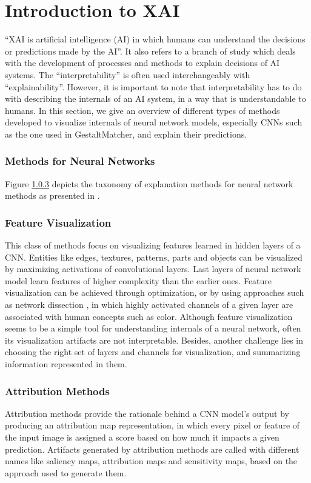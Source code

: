 \documentclass[../report.tex]{subfiles}
\begin{document}
    \section{Introduction to XAI}
	\enquote{XAI is artificial intelligence (AI) in which humans can understand the decisions or predictions made by the AI}\cite{vilone2021notions}. It also refers to a branch of study which deals with the development of processes and methods to explain decisions of AI systems. The \enquote{interpretability} is often used interchangeably with \enquote{explainability}. However, it is important to note that interpretability has to do with describing the internals of an AI system, in a way that is understandable to humans. In this section, we give an overview of different types of methods developed to visualize internals of neural network models, especially CNNs such as the one used in GestaltMatcher, and explain their predictions.
	
	\subsubsection{Methods for Neural Networks} \label{sec_nn_methods}
	Figure \ref{} depicts the taxonomy of explanation methods for neural network methods as presented in \cite{molnar2019}. 
	
	\subsubsection{Feature Visualization}
	This class of methods focus on visualizing features learned in hidden layers of a CNN. Entities like edges, textures, patterns, parts and objects can be visualized by maximizing activations of convolutional layers. Last layers of neural network model learn features of higher complexity than the earlier ones.  Feature visualization can be achieved through optimization, or by using approaches such as network dissection \cite{bau2017network}, in which highly activated channels of a given layer are associated with human concepts such as color. Although feature visualization seems to be a simple tool for understanding internals of a neural network, often its visualization artifacts are not interpretable. Besides, another challenge lies in choosing the right set of layers and channels for visualization, and summarizing information represented in them.

	\subsubsection{Attribution Methods}
	Attribution methods provide the rationale behind a CNN model's output by producing an attribution map representation, in which every pixel or feature of the input image is assigned a score based on how much it impacts a given prediction. Artifacts generated by attribution methods are called with different names like saliency maps, attribution maps and sensitivity maps, based on the approach used to generate them.
	
\end{document}
